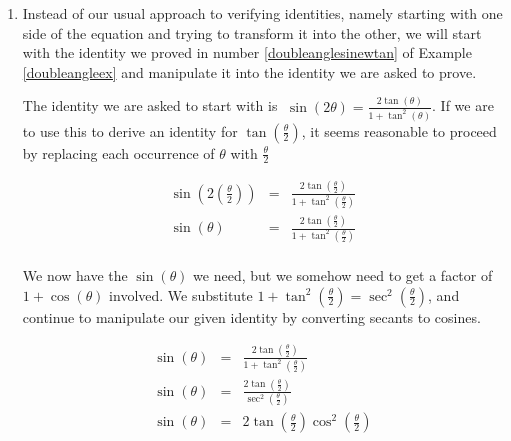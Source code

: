 \documentclass{ximera}
\begin{document}
\begin{example}
\begin{enumerate}
\vspace{-.1in}

\[ \begin{array}{rcl}

\sin\left( \frac{t}{2} \right) & = &  -\sqrt{ \frac{1-\cos\left(t \right)}{2}} = -\sqrt{ \frac{1- \left(-\frac{3}{5}\right)}{2}}\\  
                          	& = & -\sqrt{ \frac{1 + \frac{3}{5}}{2} \cdot  \frac{5}{5}} = -\sqrt{ \frac{8}{10}} =  - \frac{2\sqrt{5}}{5}\\
\end{array}\]

\item  Instead of our usual approach to verifying identities, namely starting with one side of the equation and trying to transform it into the other, we will start with the identity we proved in number \ref{doubleanglesinewtan} of Example \ref{doubleangleex} and manipulate it into the identity we are asked to prove.  

 

The identity we are asked to start with is $\; \sin(2\theta) = \frac{2\tan(\theta)}{1 + \tan^{2}(\theta)}$.  If we are to use this to derive an identity for $\tan\left(\frac{\theta}{2}\right)$, it seems reasonable to proceed by replacing each occurrence of $\theta$ with $\frac{\theta}{2}$

\vspace{-.1in}

\[ \begin{array}{rcl} 

\sin\left(2 \left(\frac{\theta}{2}\right)\right) & = &   \frac{2\tan\left(\frac{\theta}{2}\right)}{1 + \tan^{2}\left(\frac{\theta}{2}\right)} \\  
\sin(\theta) & = &  \frac{2\tan\left(\frac{\theta}{2}\right)}{1 + \tan^{2}\left(\frac{\theta}{2}\right)} \\ \end{array} \]

We now have the $\sin(\theta)$ we need, but we somehow need to get a factor of $1+\cos(\theta)$ involved.  We substitute $1 + \tan^{2}\left(\frac{\theta}{2}\right) = \sec^{2}\left(\frac{\theta}{2}\right)$, and continue  to manipulate our given identity by converting secants to cosines.

\[ \begin{array}{rcl} 

\sin(\theta) & = &   \frac{2\tan\left(\frac{\theta}{2}\right)}{1 + \tan^{2}\left(\frac{\theta}{2}\right)} \\  
\sin(\theta) & = &  \frac{2\tan\left(\frac{\theta}{2}\right)}{\sec^{2}\left(\frac{\theta}{2}\right)} \\  
\sin(\theta) & = & 2 \tan\left(\frac{\theta}{2}\right) \cos^{2}\left(\frac{\theta}{2}\right) \\ \end{array}  \]


\end{enumerate}
\end{example}
\end{document}
